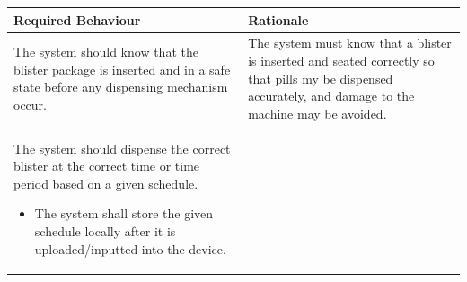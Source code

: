 \documentclass[12pt,titlepage]{article}
\begin{document}
\begin{table}[ht!]
\begin{center}
\begin{adjustbox}{max width=\textwidth}
\small
\begin{tabular}{|p{}|p{}|}
 \hline
 \textbf{Required Behaviour} & \textbf{Rationale} \\
 \hline
 The system should know that the blister package is inserted and in a safe state before any dispensing mechanism occur.  & The system must know that a blister is inserted and seated correctly so that pills my be dispensed accurately, and damage to the machine may be avoided.\\
 \hline 
 The system should dispense the correct blister at the correct time or time period based on a given schedule.
 \begin{itemize}
     \item The system shall store the given schedule locally after it is uploaded/inputted into the device.
 \end{itemize} &


\end{tabular}
\end{adjustbox}
\end{center}
\end{table}
\end{document}
